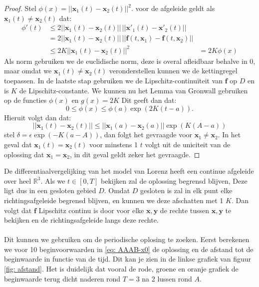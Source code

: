 \documentclass[12pt, a4paper]{article}
\newcommand{\R}{\mathbb{R}}
\newcommand{\x}{\textbf{x}}
\theoremstyle{definition}
\begin{document}
\begin{proof}
Stel $\phi(x) = ||\x_1(t) - \x_2(t)||^2$. voor de afgeleide geldt als $\x_1(t) \neq \x_2(t)$ dat:
\begin{align*}
\phi'(t) &\leq 2||\x_1(t) - \x_2(t)|| \, ||\x'_1(t) - \x'_2(t)||\\
 &= 2||\x_1(t) - \x_2(t)|| \, ||\textbf{f}(t, \x_1) - \textbf{f}(t, \x_2)||\\
 &\leq 2K||\x_1(t) - \x_2(t)||^2
 &= 2K \phi(x)
\end{align*}
Als norm gebruiken we de euclidische norm, deze is overal afleidbaar behalve in $0$, maar omdat we $\x_1(t) \neq \x_2(t)$ veronderstellen kunnen we de kettingregel toepassen. In de laatste stap gebruiken we de Lipschitz-continuïteit van $\mathbf{f}$ op $D$ en is $K$ de Lipschitz-constante. We kunnen nu het Lemma van Gronwall gebruiken op de functies $\phi(x)$ en $g(x) = 2K$ Dit geeft dan dat:
$$0 \leq \phi(x) \leq \phi(a) \exp(2K(t-a)).$$
Hieruit volgt dan dat:
$$ ||\x_1(t) - \x_2(t)|| \leq ||\x_1(a) - \x_2(a)|| \exp(K(A-a)) $$
stel $\delta = \epsilon \exp(-K(a-A))$, dan folgt het gevraagde voor $\x_1 \neq \x_2$. In het geval dat $\x_1(t) = \x_2(t)$ voor minstens 1 $t$ volgt uit de uniciteit van de oplossing dat $\x_1 = \x_2$, in dit geval geldt zeker het gevraagde.
\end{proof}
De differentiaalvergelijking van het model van Lorenz heeft een continue afgeleide over heel $\R^3$. Als we $t\in [0, T]$ bekijken zal de oplossing begrensd blijven, Deze ligt dus in een gesloten gebied $D$. Omdat $D$ gesloten is zal in elk punt elke richtingsafgeleide begrensd blijven, en kunnen we deze afschatten met 1 $K$. Dan volgt dat $\mathbf{f}$ Lipschitz continu is door voor elke $\x, \mathbf{y}$ de rechte tussen $\x, \mathbf{y}$ te bekijken en de richtingsafgeleide langs deze rechte.\\
\\
Dit kunnen we gebruiken om de periodische oplosing te zoeken. Eerst berekenen we voor 10 beginvoorwaarden in \ref{eq: AAAB-x0} de oplossing en de afstand tot de beginwaarde in functie van de tijd. Dit kan je zien in de linkse grafiek van figuur \ref{fig: afstand}. Het is duidelijk dat vooral de rode, groene en oranje grafiek de beginwaarde terug dicht naderen rond $T=3$ na 2 lussen rond $A$.
\end{document}
